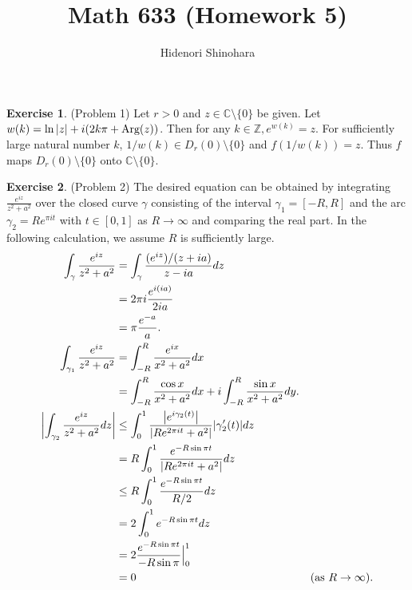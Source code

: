 \documentclass[12pt, psamsfonts]{amsart}
\theoremstyle{definition}
\newtheorem*{exer}{Exercise}
\theoremstyle{remark}
\numberwithin{equation}{section}
\begin{document}
\title{Math 633 (Homework 5)}
\author{Hidenori Shinohara}
\maketitle

\begin{exer}{(Problem 1)}
  Let $r > 0$ and $z \in \mathbb{C} \setminus \{ 0 \}$ be given.
  Let $w(k) = \ln\abs{z} + i(2k\pi + \text{Arg}(z))$.
  Then for any $k \in \mathbb{Z}, e^{w(k)} = z$.
  For sufficiently large natural number $k$, $1 / w(k) \in D_r(0) \setminus \{ 0 \}$ and $f(1/w(k)) = z$.
  Thus $f$ maps $D_r(0) \setminus \{ 0 \}$ onto $\mathbb{C} \setminus \{ 0 \}$.
\end{exer}

\begin{exer}{(Problem 2)}
  The desired equation can be obtained by integrating $\frac{e^{iz}}{z^2 + a^2}$ over the closed curve $\gamma$ consisting of the interval $\gamma_1 = [-R, R]$ and the arc $\gamma_2 = Re^{\pi it}$ with $t \in [0, 1]$ as $R \rightarrow \infty$ and comparing the real part.
  In the following calculation, we assume $R$ is sufficiently large.
  \begin{align*}
    \int_{\gamma} \frac{e^{iz}}{z^2 + a^2}
      &= \int_{\gamma} \frac{(e^{iz})/(z + ia)}{z - ia} dz \\
      &= 2\pi i\frac{e^{i(ia)}}{2ia} \\
      &= \pi\frac{e^{-a}}{a}. \\
    \int_{\gamma_1} \frac{e^{iz}}{z^2 + a^2}
      &= \int_{-R}^{R} \frac{e^{ix}}{x^2 + a^2} dx \\
      &= \int_{-R}^{R} \frac{\cos x}{x^2 + a^2} dx + i\int_{-R}^{R} \frac{\sin x}{x^2 + a^2} dy. \\
    \abs{\int_{\gamma_2}\frac{e^{iz}}{z^2 + a^2} dz}
      &\leq \int_{0}^{1}\frac{\abs{e^{i\gamma_2(t)}}}{\abs{Re^{2\pi it} + a^2}}\abs{\gamma_2'(t)} dz \\
      &= R\int_{0}^{1} \frac{e^{-R\sin \pi t}}{\abs{Re^{2\pi it} + a^2}} dz \\
      &\leq R\int_{0}^{1} \frac{e^{-R\sin \pi t}}{R / 2} dz \\
      &= 2\int_{0}^{1} e^{-R\sin \pi t} dz \\
      &= 2\frac{e^{-R\sin \pi t}}{-R \sin \pi} \Big{\vert}^1_0 \\
      &= 0 & \text{(as $R \rightarrow \infty$)}.
  \end{align*}
\end{exer}
\end{document}
